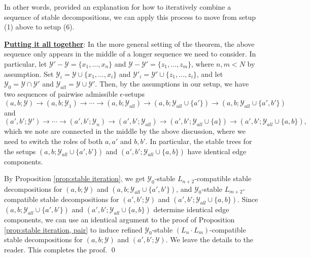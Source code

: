 \documentclass{amsart}
\theoremstyle{definition}
\theoremstyle{remark}
\theoremstyle{definition}
\newcommand{\calY}{\mathcal{Y}}
\begin{document}
In other words, provided an explanation for how to iteratively combine a sequence of stable decompositions, we can apply this process to move from setup (1) above to setup (6).

\medskip

\textbf{\underline{Putting it all together}}: In the more general setting of the theorem, the above sequence only appears in the middle of a longer sequence we need to consider.  In particular, let $\calY' - \calY = \{x_1, \dots, x_n\}$ and $\calY - \calY' = \{z_1, \dots, z_m\}$, where $n,m < N$ by assumption.  Set $\calY_i = \calY \cup \{x_1, \dots, x_i\}$ and $\calY'_i = \calY' \cup \{z_1, \dots, z_i\}$, and let $\calY_0 = \calY \cap \calY'$ and $\calY_{all} = \calY \cup \calY'$.  Then, by the assumptions in our setup, we have two sequences of pairwise admissible $\epsilon$-setups
$$(a,b;\calY) \to (a,b;\calY_1) \to \cdots \to (a,b;\calY_{all}) \to (a,b;\calY_{all} \cup \{a'\}) \to (a,b;\calY_{all} \cup \{a',b'\})$$
and
$$(a',b';\calY') \to \cdots \to (a',b'; \calY_n) \to (a',b';\calY_{all}) \to (a',b';\calY_{all} \cup \{a\}) \to (a',b';\calY_{all} \cup \{a,b\}),$$
which we note are connected in the middle by the above discussion, where we need to switch the roles of both $a,a'$ and $b,b'$.  In particular, the stable trees for the setups $(a,b;\calY_{all} \cup \{a',b'\})$ and $(a',b';\calY_{all} \cup \{a,b\})$ have identical edge components.

By Proposition \ref{prop:stable iteration}, we get $\calY_0$-stable $L_{n+2}$-compatible stable decompositions for $(a,b;\calY)$ and $(a,b;\calY_{all} \cup \{a',b'\})$, and $\calY_0$-stable $L_{m+2}$-compatible stable decompositions for $(a',b';\calY)$ and $(a',b';\calY_{all} \cup \{a,b\})$.  Since $(a,b;\calY_{all} \cup \{a',b'\})$ and $(a',b';\calY_{all} \cup \{a,b\})$ determine identical edge components, we can use an identical argument to the proof of Proposition \ref{prop:stable iteration, pair} to induce refined $\calY_0$-stable $(L_n \cdot L_m)$-compatible stable decompositions for $(a,b;\calY)$ and $(a',b';\calY)$.  We leave the details to the reader.  This completes the proof. \qed

\end{document}
